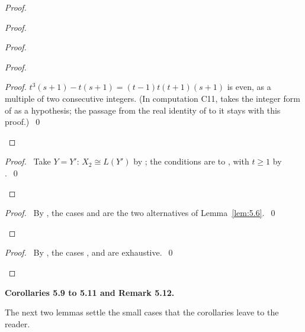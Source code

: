 \begin{proof}
\begin{proof}
\begin{proof}
\begin{proof}
\begin{proof}
     $t^3(s+1)-t(s+1)=(t-1)t(t+1)(s+1)$ is even, as a multiple of two consecutive
     integers. (In computation C11,  takes the
     integer form of  as a hypothesis; the passage from the real identity of
      to it stays with this proof.)~\qed\end{proof}
   \end{proof}
   \qedstep
   \begin{proof}\pf\ Take $Y=Y'$: $X_2\cong L(Y')$ by ; the conditions are
     to , with $t\ge1$ by .~\qed\end{proof}
  \end{proof}
  \qedstep
  \begin{proof}\pf\ By , the cases  and  are
   the two alternatives of Lemma~\ref{lem:5.6}.~\qed\end{proof}
 \end{proof}
 \qedstep
 \begin{proof}\pf\ By , the cases ,  and
   are exhaustive.~\qed\end{proof}
\end{proof}

\medskip\noindent\textbf{Corollaries 5.9 to 5.11 and Remark 5.12.}

The next two lemmas settle the small cases that the corollaries leave to the reader.

